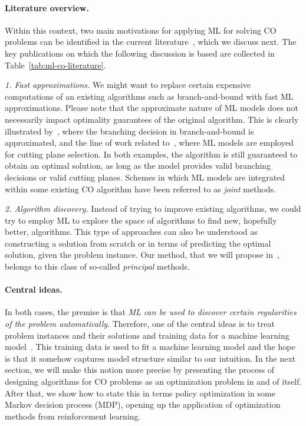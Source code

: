 \documentclass[a4paper]{report}
\theoremstyle{definition}
\theoremstyle{plain}
\begin{document}
\paragraph{Literature overview.}
Within this context, two main motivations for applying ML for solving CO
problems can be identified in the current
literature~\cite{bengioMachineLearningCombinatorial2020}, which we discuss next.
%
The key publications on which the following discussion is based are collected in
Table~\ref{tab:ml-co-literature}.

\emph{1. Fast approximations.}
%
We might want to replace certain expensive computations of an existing
algorithms such as branch-and-bound with fast ML approximations.
%
Please note that the approximate nature of ML models does not necessarily impact
optimality guarantees of the original algorithm.
%
This is clearly illustrated by~\cite{gasseExactCombinatorialOptimization2019}, where the branching decision in
branch-and-bound is approximated, and the line of work related to~\cite{tangReinforcementLearningInteger2020}, where
ML models are employed for cutting plane selection.
%
In both examples, the algorithm is still guaranteed to obtain an optimal
solution, as long as the model provides valid branching decisions or valid
cutting planes.
%
Schemes in which ML models are integrated within some existing CO algorithm have
been referred to as \emph{joint} methods.

\emph{2. Algorithm discovery.}
%
Instead of trying to improve existing algorithms, we could try to employ ML to
explore the space of algorithms to find new, hopefully better, algorithms.
%
This type of approaches can also be understood as constructing a solution from
scratch or in terms of predicting the optimal solution, given the problem
instance.
%
Our method, that we will propose in~, belongs to this
class of so-called \emph{principal} methods.

\paragraph{Central ideas.}
In both cases, the premise is that \emph{ML can be used to discover certain
  regularities of the problem automatically}.
%
Therefore, one of the central ideas is to treat problem instances and their
solutions and training data for a machine learning model~\cite{bengioMachineLearningCombinatorial2020}.
%
This training data is used to fit a machine learning model and the hope is that
it somehow captures model structure similar to our intuition.
%
In the next section, we will make this notion more precise by presenting
the process of designing algorithms for CO problems as an optimization problem
in and of itself.
%
After that, we show how to state this in terms policy optimization in some
Markov decision process (MDP), opening up the application of optimization
methods from reinforcement learning.
\end{document}
